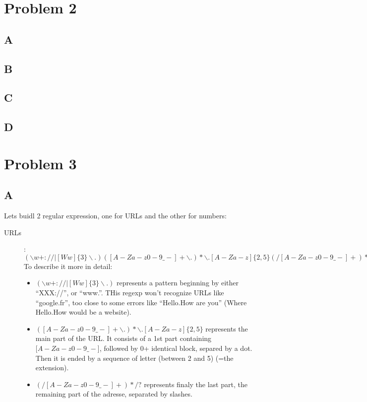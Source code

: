 \documentclass{article}
\begin{document}
    \section{Problem 2}
        \subsection{A}
        \subsection{B}
        \subsection{C}
        \subsection{D}
    \newpage
    \section{Problem 3}
        \subsection{A}
            Lets buidl 2 regular expression, one for URLs and the other for numbers:
            \begin{description}
                \item[URLs]: $(\backslash w+://|[Ww]\{3\}\backslash.)([A-Za-z0-9\_-]+\backslash .)*\backslash .[A-Za-z]\{2,5\}(/[A-Za-z0-9\_-]+)*/?$\\
                    To describe it more in detail:
                    \begin{itemize}
                        \item $(\backslash w+://|[Ww]\{3\}\backslash.)$ represents a pattern beginning by either ``XXX://'', or ``www.''. THis regexp won't recognize URLs like ``google.fr'', too close to some errors like ``Hello.How are you'' (Where Hello.How would be a website).
                        \item $([A-Za-z0-9\_-]+\backslash .)*\backslash .[A-Za-z]\{2,5\}$ represents the main part of the URL. It consists of a 1st part containing $[A-Za-z0-9\_-$], followed by 0+ identical block, separed by a dot. Then it is ended by a sequence of letter (between 2 and 5) (=the extension).
                        \item $(/[A-Za-z0-9\_-]+)*/?$ represents finaly the last part, the remaining part of the adresse, separated by slashes.
                    \end{itemize}

            \end{description}
\end{document}
